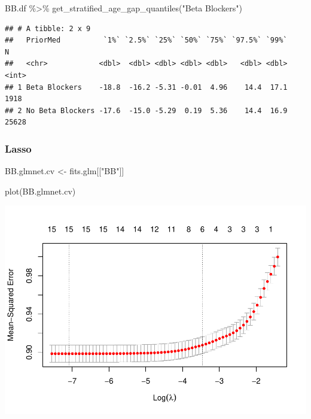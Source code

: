 \documentclass[
]{article}
\newenvironment{Shaded}{\begin{snugshade}}{\end{snugshade}}
\newcommand{\FunctionTok}[1]{\textcolor[rgb]{0.00,0.00,0.00}{#1}}
\newcommand{\NormalTok}[1]{#1}
\newcommand{\OtherTok}[1]{\textcolor[rgb]{0.56,0.35,0.01}{#1}}
\newcommand{\SpecialCharTok}[1]{\textcolor[rgb]{0.00,0.00,0.00}{#1}}
\newcommand{\StringTok}[1]{\textcolor[rgb]{0.31,0.60,0.02}{#1}}
\begin{document}
\begin{Shaded}
\begin{Highlighting}[]
\NormalTok{BB.df }\SpecialCharTok{\%\textgreater{}\%} 
 \FunctionTok{get\_stratified\_age\_gap\_quantiles}\NormalTok{(}\StringTok{"Beta Blockers"}\NormalTok{)}
\end{Highlighting}
\end{Shaded}

\begin{verbatim}
## # A tibble: 2 x 9
##   PriorMed          `1%` `2.5%` `25%` `50%` `75%` `97.5%` `99%`     N
##   <chr>            <dbl>  <dbl> <dbl> <dbl> <dbl>   <dbl> <dbl> <int>
## 1 Beta Blockers    -18.8  -16.2 -5.31 -0.01  4.96    14.4  17.1  1918
## 2 No Beta Blockers -17.6  -15.0 -5.29  0.19  5.36    14.4  16.9 25628
\end{verbatim}

\hypertarget{lasso-3}{%
\subsubsection{Lasso}\label{lasso-3}}

\begin{Shaded}
\begin{Highlighting}[]
\NormalTok{BB.glmnet.cv }\OtherTok{\textless{}{-}}\NormalTok{ fits.glm[[}\StringTok{"BB"}\NormalTok{]]}
\end{Highlighting}
\end{Shaded}

\begin{Shaded}
\begin{Highlighting}[]
\FunctionTok{plot}\NormalTok{(BB.glmnet.cv) }
\end{Highlighting}
\end{Shaded}

\includegraphics{../results/report_files/figure-latex/BB-lasso-plot-1.pdf}
\end{document}
